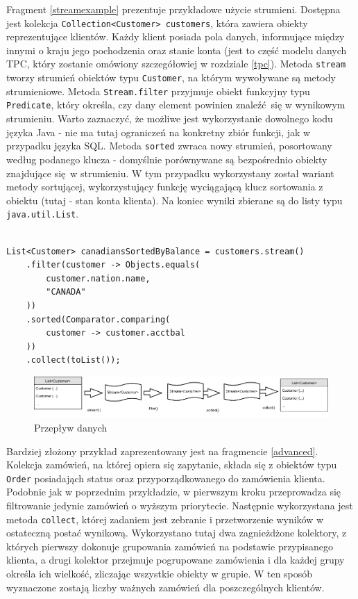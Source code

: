 \documentclass[12pt]{extarticle}
\begin{document}
    Fragment \ref{streamexample} prezentuje przykładowe użycie strumieni. Dostępna jest kolekcja \newline \texttt{Collection<Customer> customers}, która zawiera obiekty reprezentujące klientów. Każdy klient posiada pola danych, informujące między innymi o kraju jego pochodzenia oraz stanie konta (jest to część modelu danych TPC, który zostanie omówiony szczegółowiej w rozdziale \ref{tpc}). Metoda \texttt{stream} tworzy strumień obiektów typu \texttt{Customer}, na którym wywoływane są metody strumieniowe. Metoda \texttt{Stream.filter} przyjmuje obiekt funkcyjny typu \texttt{Predicate}, który określa, czy dany element powinien znaleźć się w wynikowym strumieniu. Warto zaznaczyć, że możliwe jest wykorzystanie dowolnego kodu języka Java - nie ma tutaj ograniczeń na konkretny zbiór funkcji, jak w przypadku języka SQL. Metoda \texttt{sorted} zwraca nowy strumień, posortowany według podanego klucza - domyślnie porównywane są bezpośrednio obiekty znajdujące się w strumieniu. W tym przypadku wykorzystany został wariant metody sortującej, wykorzystujący funkcję wyciągającą klucz sortowania z obiektu (tutaj - stan konta klienta). Na koniec wyniki zbierane są do listy typu \texttt{java.util.List}. 

\begin{lstlisting}[label=streamexample, caption=Przykładowe wykorzystanie Stream API]

List<Customer> canadiansSortedByBalance = customers.stream()
    .filter(customer -> Objects.equals(
        customer.nation.name,
        "CANADA"
    ))
    .sorted(Comparator.comparing(
        customer -> customer.acctbal
    ))
    .collect(toList());

\end{lstlisting}

\begin{figure}
\centering
\includegraphics[width=14cm]{flow.png}
\caption{Przepływ danych}
\label{fig:flow}
\end{figure}

    Bardziej złożony przykład zaprezentowany jest na fragmencie \ref{advanced}. Kolekcja zamówień, na której opiera się zapytanie, składa się z obiektów typu \texttt{Order} posiadająch status oraz przyporządkowanego do zamówienia klienta. Podobnie jak w poprzednim przykładzie, w pierwszym kroku przeprowadza się filtrowanie jedynie zamówień o wyższym priorytecie. Następnie wykorzystana jest metoda \texttt{collect}, której zadaniem jest zebranie i przetworzenie wyników w ostateczną postać wynikową. Wykorzystano tutaj dwa zagnieżdżone kolektory, z których pierwszy dokonuje grupowania zamówień na podstawie przypisanego klienta, a drugi kolektor przejmuje pogrupowane zamówienia i dla każdej grupy określa ich wielkość, zliczając wszystkie obiekty w grupie. W ten sposób wyznaczone zostają liczby ważnych zamówień dla poszczególnych klientów.
\end{document}
